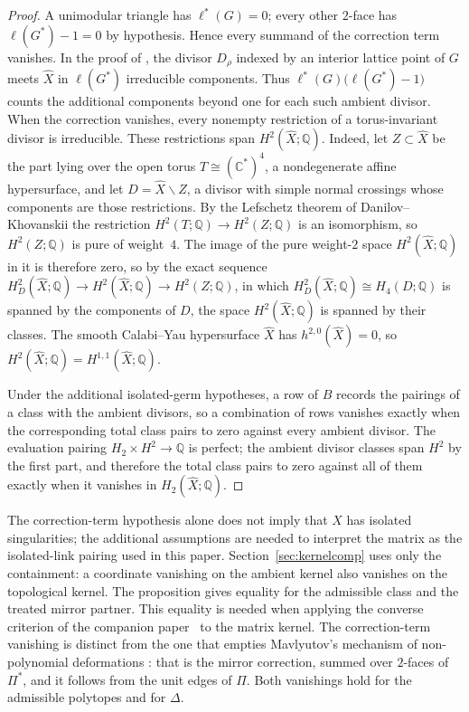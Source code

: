 \documentclass[11pt]{amsart}
\theoremstyle{definition}
\theoremstyle{remark}
\theoremstyle{plain}
\newcommand{\QQ}{\mathbb{Q}}
\newcommand{\CC}{\mathbb{C}}
\newcommand{\Xh}{\widehat{X}}
\begin{document}
\begin{proof}
A unimodular triangle has $\ell^{*}(G)=0$; every other $2$-face has
$\ell(G^{*})-1=0$ by hypothesis.  Hence every summand of the correction
term vanishes.  In the proof of \cite[Theorem~4.4.2]{Batyrev94}, the
divisor $D_{\rho}$ indexed by an interior lattice point of $G$ meets
$\Xh$ in $\ell(G^{*})$ irreducible components.  Thus
$\ell^{*}(G)\bigl(\ell(G^{*})-1\bigr)$ counts the additional components
beyond one for each such ambient divisor.  When the correction vanishes,
every nonempty restriction of a torus-invariant divisor is irreducible.
These restrictions span $H^2(\Xh;\QQ)$.  Indeed, let $Z\subset\Xh$ be the
part lying over the open torus $T\cong(\CC^*)^4$, a nondegenerate affine
hypersurface, and let $D=\Xh\smallsetminus Z$, a divisor with simple normal
crossings whose components are those restrictions.  By the Lefschetz
theorem of Danilov--Khovanskii \cite[Proposition~3.9 and Remark~3.10]{DK86} the restriction
$H^2(T;\QQ)\to H^2(Z;\QQ)$ is an isomorphism, so $H^2(Z;\QQ)$ is pure of
weight~$4$.  The image of the pure weight-$2$ space $H^2(\Xh;\QQ)$ in it is
therefore zero, so by the exact sequence
$H^2_D(\Xh;\QQ)\to H^2(\Xh;\QQ)\to H^2(Z;\QQ)$, in which
$H^2_D(\Xh;\QQ)\cong H_4(D;\QQ)$ is spanned by the components of $D$, the
space $H^2(\Xh;\QQ)$ is spanned by their classes.
The smooth Calabi--Yau hypersurface $\Xh$ has $h^{2,0}(\Xh)=0$, so
$H^2(\Xh;\QQ)=H^{1,1}(\Xh;\QQ)$.

Under the additional isolated-germ hypotheses, a row of $B$ records the
pairings of a class with the ambient divisors, so a combination of rows
vanishes exactly when the corresponding total class pairs to zero against
every ambient divisor.  The evaluation pairing
$H_2\times H^2\to\QQ$ is perfect; the ambient divisor classes span
$H^2$ by the first part, and therefore the total class pairs to zero
against all of them exactly when it vanishes in $H_2(\Xh;\QQ)$.
\end{proof}

The correction-term hypothesis alone does not imply that $X$ has isolated
singularities; the additional assumptions are needed to interpret the
matrix as the isolated-link pairing used in this paper.
Section~\ref{sec:kernelcomp} uses only the containment: a coordinate
vanishing on the ambient kernel also vanishes on the topological kernel.
The proposition gives equality for the admissible class and the treated
mirror partner.  This equality is needed when applying the converse
criterion of the companion paper~\cite{PaperV} to the matrix kernel.
The correction-term vanishing is distinct from the one that
empties Mavlyutov's mechanism of non-polynomial deformations
\cite{Mav04}: that is the mirror correction, summed over $2$-faces of
$\Pi^{*}$, and it follows from the unit edges of $\Pi$.  Both vanishings
hold for the admissible polytopes and for $\Delta$.
\end{document}
